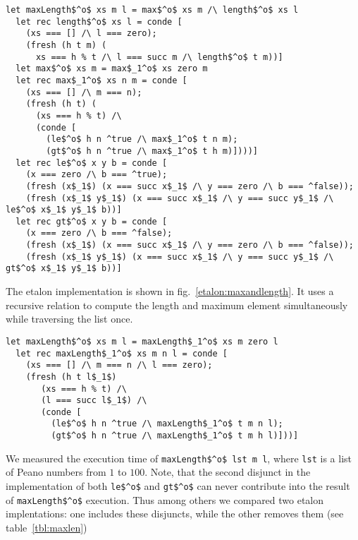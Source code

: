 \begin{figure*}[!h]
  \centering
  \begin{minipage}{0.85\textwidth}
\begin{lstlisting}[label={cpd:maxandlength}, caption={Maximum element and length of the list}, captionpos=b, frame=tb]
  let maxLength$^o$ xs m l = max$^o$ xs m /\ length$^o$ xs l
  let rec length$^o$ xs l = conde [
    (xs === [] /\ l === zero);
    (fresh (h t m) (
      xs === h % t /\ l === succ m /\ length$^o$ t m))]
  let max$^o$ xs m = max$_1^o$ xs zero m
  let rec max$_1^o$ xs n m = conde [
    (xs === [] /\ m === n);
    (fresh (h t) (
      (xs === h % t) /\
      (conde [
        (le$^o$ h n ^true /\ max$_1^o$ t n m);
        (gt$^o$ h n ^true /\ max$_1^o$ t h m)])))]
  let rec le$^o$ x y b = conde [
    (x === zero /\ b === ^true);
    (fresh (x$_1$) (x === succ x$_1$ /\ y === zero /\ b === ^false));
    (fresh (x$_1$ y$_1$) (x === succ x$_1$ /\ y === succ y$_1$ /\ le$^o$ x$_1$ y$_1$ b))]
  let rec gt$^o$ x y b = conde [
    (x === zero /\ b === ^false);
    (fresh (x$_1$) (x === succ x$_1$ /\ y === zero /\ b === ^false));
    (fresh (x$_1$ y$_1$) (x === succ x$_1$ /\ y === succ y$_1$ /\ gt$^o$ x$_1$ y$_1$ b))]
  \end{lstlisting}
\end{minipage}
\end{figure*}

The etalon implementation is shown in fig.~\ref{etalon:maxandlength}.
It uses a recursive relation to compute the length and maximum element simultaneously while traversing the list once.

\begin{figure*}[!h]
  \centering
  \begin{minipage}{0.7\textwidth}
\begin{lstlisting}[label={etalon:maxandlength}, caption={Etalon implementation of maxlengtho}, captionpos=b, frame=tb]
  let maxLength$^o$ xs m l = maxLength$_1^o$ xs m zero l
  let rec maxLength$_1^o$ xs m n l = conde [
    (xs === [] /\ m === n /\ l === zero);
    (fresh (h t l$_1$)
       (xs === h % t) /\
       (l === succ l$_1$) /\
       (conde [
         (le$^o$ h n ^true /\ maxLength$_1^o$ t m n l);
         (gt$^o$ h n ^true /\ maxLength$_1^o$ t m h l)]))]
  \end{lstlisting}
\end{minipage}
\end{figure*}

We measured the execution time of \lstinline{maxLength$^o$ lst m l}, where \lstinline{lst} is a list of Peano numbers from $1$ to $100$.
Note, that the second disjunct in the implementation of both \lstinline{le$^o$} and \lstinline{gt$^o$} can never contribute into the result of \lstinline{maxLength$^o$} execution.
Thus among others we compared two etalon implentations: one includes these disjuncts, while the other removes them (see table~\ref{tbl:maxlen})


